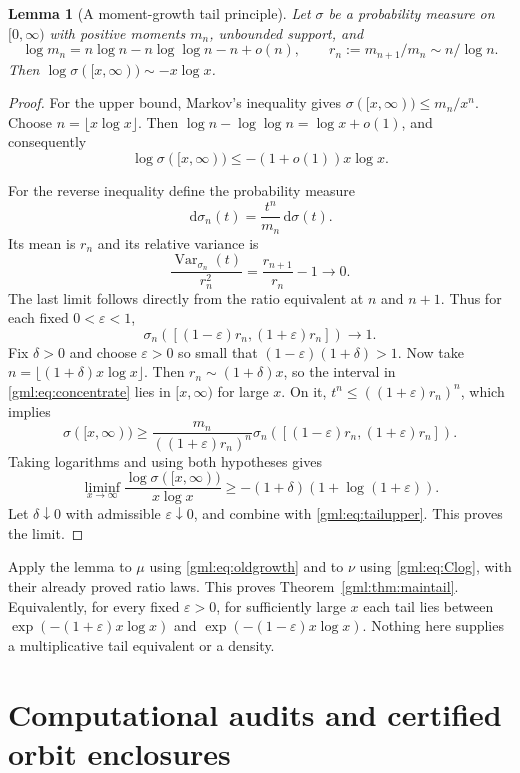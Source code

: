 \documentclass[11pt]{article}
\numberwithin{equation}{section}
\newtheorem{lemma}[theorem]{Lemma}
\theoremstyle{definition}
\theoremstyle{remark}
\newcommand{\eps}{\varepsilon}
\newcommand{\dd}{\,\mathrm d}
\begin{document}
\begin{lemma}[A moment-growth tail principle]\label{gml:lem:tails}
Let $\sigma$ be a probability measure on $[0,\infty)$ with positive
moments $m_n$, unbounded support, and
\[
 \log m_n=n\log n-n\log\log n-n+o(n),\qquad
 r_n:=m_{n+1}/m_n\sim n/\log n.
\]
Then $\log\sigma([x,\infty))\sim-x\log x$.
\end{lemma}
\begin{proof}
For the upper bound, Markov's inequality gives
$\sigma([x,\infty))\le m_n/x^n$. Choose
$n=\lfloor x\log x\rfloor$. Then
$\log n-\log\log n=\log x+o(1)$, and consequently
\begin{equation}\label{gml:eq:tailupper}
 \log\sigma([x,\infty))\le-(1+o(1))x\log x.
\end{equation}

For the reverse inequality define the probability measure
\[
 \dd\sigma_n(t)=\frac{t^n}{m_n}\dd\sigma(t).
\]
Its mean is $r_n$ and its relative variance is
\[
 \frac{\operatorname{Var}_{\sigma_n}(t)}{r_n^2}
   =\frac{r_{n+1}}{r_n}-1\longrightarrow0.
\]
The last limit follows directly from the ratio equivalent at $n$ and $n+1$.
Thus for each fixed $0<\eps<1$,
\begin{equation}\label{gml:eq:concentrate}
 \sigma_n([(1-\eps)r_n,(1+\eps)r_n])\longrightarrow1.
\end{equation}
Fix $\delta>0$ and choose $\eps>0$ so small that
$(1-\eps)(1+\delta)>1$. Now take
$n=\lfloor(1+\delta)x\log x\rfloor$.
Then $r_n\sim(1+\delta)x$, so the interval in \eqref{gml:eq:concentrate}
lies in $[x,\infty)$ for large $x$. On it, $t^n\le((1+\eps)r_n)^n$,
which implies
\[
 \sigma([x,\infty))\ge
 \frac{m_n}{((1+\eps)r_n)^n}
 \sigma_n([(1-\eps)r_n,(1+\eps)r_n]).
\]
Taking logarithms and using both hypotheses gives
\[
 \liminf_{x\to\infty}\frac{\log\sigma([x,\infty))}{x\log x}
 \ge-(1+\delta)(1+\log(1+\eps)).
\]
Let $\delta\downarrow0$ with admissible $\eps\downarrow0$, and combine
with \eqref{gml:eq:tailupper}. This proves the limit.
\end{proof}

Apply the lemma to $\mu$ using \eqref{gml:eq:oldgrowth} and to $\nu$ using
\eqref{gml:eq:Clog}, with their already proved ratio laws. This proves
Theorem~\ref{gml:thm:maintail}. Equivalently, for every fixed $\eps>0$,
for sufficiently large $x$ each tail lies between
$\exp(-(1+\eps)x\log x)$ and $\exp(-(1-\eps)x\log x)$.
Nothing here supplies a multiplicative tail equivalent or a density.

\section{Computational audits and certified orbit enclosures}\label{gml:sec:computation}
\end{document}

